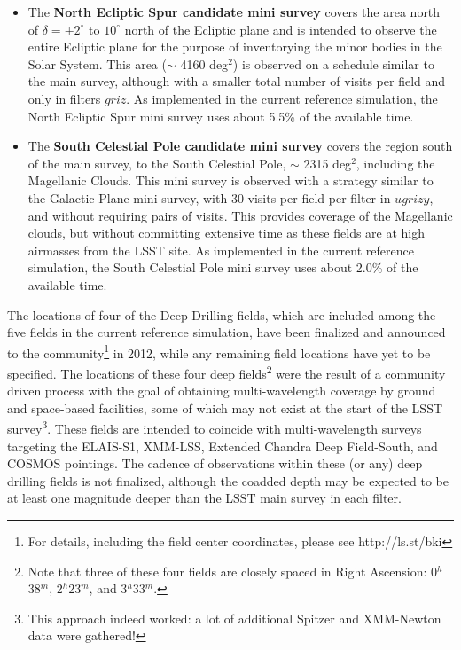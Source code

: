 \documentclass[DM,lsstdraft,toc,usenatbib]{lsstdoc}
\begin{document}
\begin{itemize}
provide astrometry and photometry of stars toward the Galactic center but without reaching the confusion limit in the coadded images.
There is no requirement for pairs of visits in each night in this area. As implemented in the current reference simulation, the Galactic Plane mini survey uses
about 1.6\% of the available time.
\item The {\bf North Ecliptic Spur candidate mini survey} covers the area north of $\delta = +2^\circ$ to $10^\circ$ north of the Ecliptic plane
and is intended to observe the entire Ecliptic plane for the purpose of inventorying the minor bodies in the Solar System. This area ($\sim$ 4160 deg$^2$) 
is observed on a schedule similar to the main survey, although with a smaller total number of visits per field and only in filters $griz$. 
As implemented in the current reference simulation, the North Ecliptic Spur mini survey uses about 5.5\% of the available time. 
\item The {\bf South Celestial Pole candidate mini survey} covers the region south of the main survey, to the South Celestial Pole, $\sim$ 2315 deg$^2$,
including the Magellanic Clouds. 
This mini survey is observed with a strategy similar to the Galactic Plane mini survey, with 30 visits per field per filter in $ugrizy$, 
and without requiring pairs of visits. This provides coverage of the Magellanic clouds, but without committing extensive time as these fields are
at high airmasses from the LSST site. As implemented in the current reference simulation, the South Celestial Pole mini survey uses
about 2.0\% of the available time.
\end{itemize}

The locations of four of the Deep Drilling fields, which are included among the five fields in the current reference simulation, 
have been finalized and announced to the community\footnote{For details, including the field center coordinates, 
please see http://ls.st/bki} in 2012, while any remaining field locations 
have yet to be specified. The locations of these four deep fields\footnote{Note that three of these four fields are
closely spaced in Right Ascension: 0$^h$38$^m$, 2$^h$23$^m$, and 3$^h$33$^m$.} were 
the result of a community driven process 
with the goal of obtaining multi-wavelength coverage by ground and space-based facilities,  some of which may 
not exist at the start of the LSST survey\footnote{This approach indeed worked: a lot of additional Spitzer and XMM-Newton 
data were gathered!}.
These fields are intended to coincide with multi-wavelength surveys targeting the ELAIS-S1, XMM-LSS, Extended Chandra Deep Field-South, 
and COSMOS pointings. The cadence of observations within these (or any) deep drilling fields is not finalized, although the coadded
depth may be expected to be at least one magnitude deeper than the LSST main survey in each filter.
\end{document}
